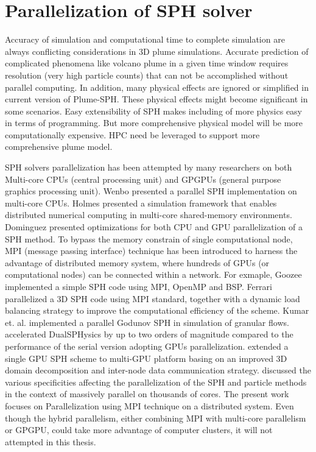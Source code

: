 \section{Parallelization of SPH solver}

Accuracy of simulation and computational time to complete simulation are always conflicting considerations in 3D plume simulations. Accurate prediction of complicated phenomena like volcano plume in a given time window requires resolution (very high particle counts) that can not be accomplished without parallel computing. In addition, many physical effects are ignored or simplified in current version of Plume-SPH. These physical effects might become significant in some scenarios. Easy extensibility of SPH makes including of more physics easy in terms of programming. But more comprehensive physical model will be more computationally expensive. HPC need be leveraged to support more comprehensive plume model.

SPH solvers parallelization has been attempted by many researchers on both Multi-core CPUs (central processing unit) and GPGPUs (general purpose graphics processing unit). Wenbo \cite{wenbo2014performance} presented a parallel SPH implementation on multi-core CPUs. Holmes \cite{holmes2011framework} presented a simulation framework that enables distributed numerical computing in multi-core shared-memory environments. Dominguez \cite{dominguez2011optimization} presented optimizations for both CPU and GPU parallelization of a SPH method. To bypass the memory constrain of single computational node, MPI (message passing interface) technique has been introduced to harness the advantage of distributed memory system, where hundreds of GPUs (or computational nodes) can be connected within a network. For exmaple, Goozee \cite{goozee2003distributed} implemented a simple SPH code using MPI, OpenMP and BSP. 
Ferrari \cite{ferrari2009new} parallelized a 3D SPH code using MPI standard, together with a dynamic load balancing strategy to improve the computational efficiency of the scheme. Kumar et. al. \cite{kumar2013parallel} implemented a parallel Godunov SPH in simulation of granular flows. \citet{crespo2015dualsphysics} accelerated DualSPHysics by up to two orders of magnitude compared to the performance of the serial version adopting GPUs parallelization. \citet{ji2016large} 
extended a single GPU SPH scheme to multi-GPU platform basing on an improved 3D domain decomposition and inter-node data communication strategy. \citet{oger2016distributed} discussed the various specificities affecting the parallelization of the SPH and particle methods in the context of massively parallel on thousands of cores.
The present work focuses on Parallelization using MPI technique on a distributed system. Even though the hybrid parallelism, either combining MPI with multi-core parallelism or GPGPU, could take more advantage of computer clusters, it will not attempted in this thesis.

